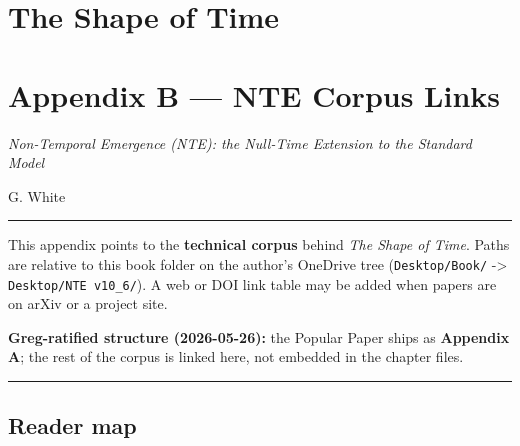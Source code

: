 \documentclass[
  11pt,
]{article}
\author{}
\date{}
\begin{document}
\section{The Shape of Time}\label{the-shape-of-time}

\section{Appendix B --- NTE Corpus
Links}\label{appendix-b-nte-corpus-links}

\emph{Non-Temporal Emergence (NTE): the Null-Time Extension to the
Standard Model}

G. White

\begin{center}\rule{0.5\linewidth}{0.5pt}\end{center}

This appendix points to the \textbf{technical corpus} behind \emph{The
Shape of Time}. Paths are relative to this book folder on the author's
OneDrive tree (\texttt{Desktop/Book/} -\textgreater{}
\texttt{Desktop/NTE\ v10\_6/}). A web or DOI link table may be added
when papers are on arXiv or a project site.

\textbf{Greg-ratified structure (2026-05-26):} the Popular Paper ships
as \textbf{Appendix A}; the rest of the corpus is linked here, not
embedded in the chapter files.

\begin{center}\rule{0.5\linewidth}{0.5pt}\end{center}

\subsection{Reader map}\label{reader-map}
\end{document}
